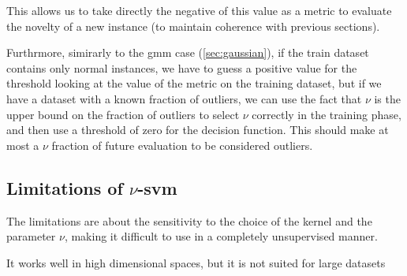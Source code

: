 This allows us to take directly the negative of this value as a metric to evaluate the novelty of a new instance (to maintain coherence with previous sections). 

Furthrmore, simirarly to the \gls{gmm} case (\autoref{sec:gaussian}), if the train dataset contains only normal instances, we have to guess a positive value for the threshold looking at the value of the metric on the training dataset, but if we have a dataset with a known fraction of outliers, we can use the fact that $\nu$ is the upper bound on the fraction of outliers to select $\nu$ correctly in the training phase, and then use a threshold of zero for the decision function. This should make at most a $\nu$ fraction of future evaluation to be considered outliers.

\subsection{Limitations of $\nu$-\gls{svm}}

The limitations are about the sensitivity to the choice of the kernel and the parameter $\nu$, making it difficult to use in a completely unsupervised manner. 

It works well in high dimensional spaces, but it is not suited for large datasets 